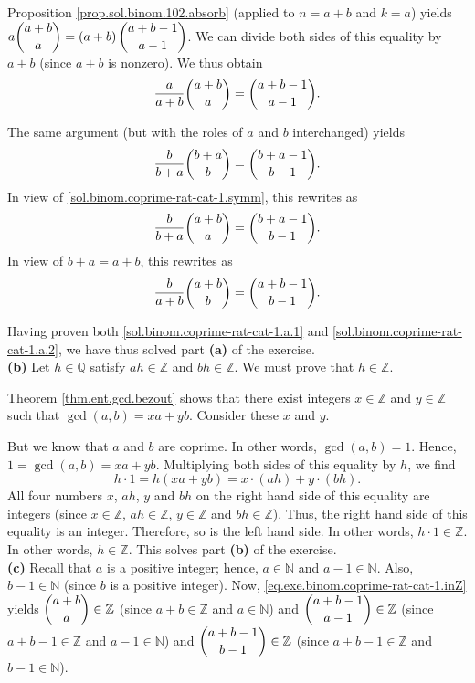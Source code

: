 \documentclass[paper=a4, fontsize=12pt]{scrartcl}%
\theoremstyle{plainsl}
\theoremstyle{definition}
\theoremstyle{remark}
\begin{document}
Proposition \ref{prop.sol.binom.102.absorb} (applied to $n=a+b$ and $k=a$)
yields $a\dbinom{a+b}{a}=\left(  a+b\right)  \dbinom{a+b-1}{a-1}$. We can
divide both sides of this equality by $a+b$ (since $a+b$ is nonzero). We thus
obtain
\begin{equation}
\dfrac{a}{a+b}\dbinom{a+b}{a}=\dbinom{a+b-1}{a-1}.
\label{sol.binom.coprime-rat-cat-1.a.1}%
\end{equation}


The same argument (but with the roles of $a$ and $b$ interchanged) yields%
\[
\dfrac{b}{b+a}\dbinom{b+a}{b}=\dbinom{b+a-1}{b-1}.
\]
In view of \eqref{sol.binom.coprime-rat-cat-1.symm}, this rewrites as%
\[
\dfrac{b}{b+a}\dbinom{a+b}{a}=\dbinom{b+a-1}{b-1}.
\]
In view of $b+a=a+b$, this rewrites as%
\begin{equation}
\dfrac{b}{a+b}\dbinom{a+b}{b}=\dbinom{a+b-1}{b-1}.
\label{sol.binom.coprime-rat-cat-1.a.2}%
\end{equation}


Having proven both \eqref{sol.binom.coprime-rat-cat-1.a.1} and
\eqref{sol.binom.coprime-rat-cat-1.a.2}, we have thus solved part \textbf{(a)}
of the exercise. \\[0.4cm]

\textbf{(b)} Let $h\in\mathbb{Q}$ satisfy $ah\in\mathbb{Z}$ and $bh\in
\mathbb{Z}$. We must prove that $h\in\mathbb{Z}$.

Theorem \ref{thm.ent.gcd.bezout} shows that there exist integers
$x\in\mathbb{Z}$ and $y\in\mathbb{Z}$ such that $\gcd\left(  a,b\right)
=xa+yb$. Consider these $x$ and $y$.

But we know that $a$ and $b$ are coprime. In other words, $\gcd\left(
a,b\right)  =1$. Hence, $1=\gcd\left(  a,b\right)  =xa+yb$. Multiplying both
sides of this equality by $h$, we find%
\[
h\cdot1=h\left(  xa+yb\right)  =x\cdot\left(  ah\right)  +y\cdot\left(
bh\right)  .
\]
All four numbers $x$, $ah$, $y$ and $bh$ on the right hand side of this
equality are integers (since $x\in\mathbb{Z}$, $ah\in\mathbb{Z}$,
$y\in\mathbb{Z}$ and $bh\in\mathbb{Z}$). Thus, the right hand side of this
equality is an integer. Therefore, so is the left hand side. In other words,
$h\cdot1\in\mathbb{Z}$. In other words, $h\in\mathbb{Z}$. This solves part
\textbf{(b)} of the exercise. \\[0.4cm]

\textbf{(c)} Recall that $a$ is a positive integer; hence, $a\in\mathbb{N}$
and $a-1\in\mathbb{N}$. Also, $b-1\in\mathbb{N}$ (since $b$ is a positive
integer). Now, \eqref{eq.exe.binom.coprime-rat-cat-1.inZ} yields $\dbinom
{a+b}{a}\in\mathbb{Z}$ (since $a+b\in\mathbb{Z}$ and $a\in\mathbb{N}$) and
$\dbinom{a+b-1}{a-1}\in\mathbb{Z}$ (since $a+b-1\in\mathbb{Z}$ and
$a-1\in\mathbb{N}$) and $\dbinom{a+b-1}{b-1}\in\mathbb{Z}$ (since
$a+b-1\in\mathbb{Z}$ and $b-1\in\mathbb{N}$).
\end{document}
